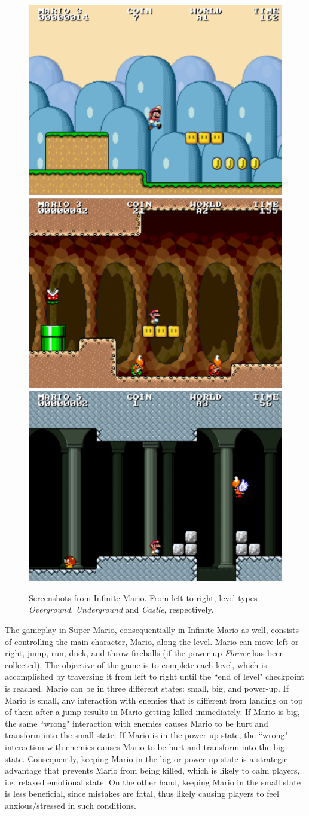 \begin{figure}[h]
  \centering
  \includegraphics[width=.32\textwidth]{Content/figures/mario-overground}\hfill
  \includegraphics[width=.32\textwidth]{Content/figures/mario-underground}\hfill
  \includegraphics[width=.32\textwidth]{Content/figures/mario-castle}
  \caption{Screenshots from Infinite Mario. From left to right, level types \textit{Overground}, \textit{Underground} and \textit{Castle}, respectively.}
  \label{fig:experiment2-infinite-mario}
\end{figure}

The gameplay in Super Mario, consequentially in Infinite Mario as well, consists of controlling the main character, Mario, along the level. Mario can move left or right, jump, run, duck, and throw fireballs (if the power-up \textit{Flower} has been collected). The objective of the game is to complete each level, which is accomplished by traversing it from left to right until the ``end of level" checkpoint is reached. Mario can be in three different states: small, big, and power-up. If Mario is small, any interaction with enemies that is different from landing on top of them after a jump results in Mario getting killed immediately. If Mario is big, the same ``wrong" interaction with enemies causes Mario to be hurt and transform into the small state. If Mario is in the power-up state, the ``wrong" interaction with enemies causes Mario to be hurt and transform into the big state. Consequently, keeping Mario in the big or power-up state is a strategic advantage that prevents Mario from being killed, which is likely to calm players, i.e. relaxed emotional state. On the other hand, keeping Mario in the small state is less beneficial, since mistakes are fatal, thus likely causing players to feel anxious/stressed in such conditions.

